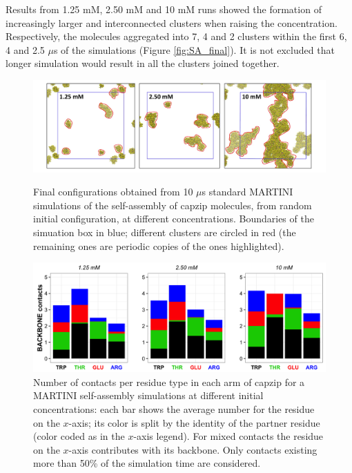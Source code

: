 Results from 1.25 mM, 2.50 mM and 10 mM runs showed the formation of increasingly larger and interconnected clusters when raising the concentration. Respectively, the molecules aggregated into 7, 4 and 2 clusters within the first 6, 4 and 2.5 $\mu$s of the simulations (Figure \ref{fig:SA_final}). It is not excluded that longer simulation would result in all the clusters joined together.
%
\begin{figure}
\centering
\includegraphics[width=0.95\linewidth]{3results_capsule/pics/final_SA.png} 
\caption[Self-assembly simulations, final configurations]{Final configurations obtained from 10 $\mu$s standard MARTINI simulations of the self-assembly of capzip molecules, from random initial configuration, at different concentrations. Boundaries of the simuation box in blue; different clusters are circled in red (the remaining ones are periodic copies of the ones highlighted).}
\label{fig:SA_final}
\vspace{0.7cm}
\includegraphics[width=0.95\linewidth]{3results_capsule/pics/contacts_SA.png} 
\caption[Self-assembly simulations: contacts]{Number of contacts per residue type in each arm of capzip for a MARTINI self-assembly simulations at different initial concentrations: each bar shows the average number for the residue on the $x$-axis; its color is split by the identity of the partner residue (color coded as in the $x$-axis legend). For mixed contacts the residue on the $x$-axis contributes with its backbone. Only contacts existing more than 50\% of the simulation time are considered.}
\label{fig:SA_contacts}
\vspace{0.7cm}

\end{figure}
